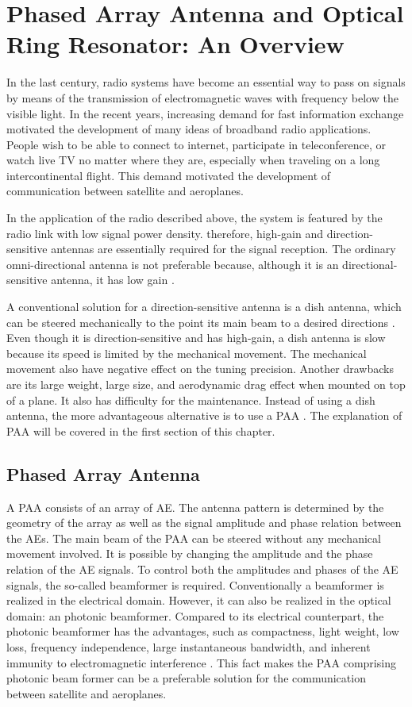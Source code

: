 %
\chapter{Phased Array Antenna and Optical Ring Resonator: An Overview}

In the last century, radio systems have become an essential way to pass on signals by means of the transmission of electromagnetic waves with frequency below the visible light. In the recent years, increasing demand for fast information exchange motivated the development of many ideas of broadband radio applications. People wish to be able to connect to internet, participate in teleconference, or watch live TV no matter where they are, especially when traveling on a long intercontinental flight. This demand motivated the development of communication between satellite and aeroplanes.

In the application of the radio described above, the system is featured by the radio link with low signal power density. therefore, high-gain and direction-sensitive antennas are essentially required for the signal reception. The ordinary omni-directional antenna is not preferable because, although it is an directional-sensitive antenna, it has low gain \citep{cheng1989field}.

A conventional solution for a direction-sensitive antenna is a dish antenna, which can be steered mechanically to the point its main beam to a desired directions \citep{wilson2013tools}. Even though it is direction-sensitive and has high-gain, a dish antenna is slow because its speed is limited by the mechanical movement. The mechanical movement also have negative effect on the tuning precision. Another drawbacks are its large weight, large size, and aerodynamic drag effect when mounted on top of a plane. It also has difficulty for the maintenance. Instead of using a dish antenna, the more advantageous alternative is to use a \ac{PAA} \cite{balanis2008modern,MeijerinkPhased}. The explanation of \ac{PAA} will be covered in the first section of this chapter.

\section{Phased Array Antenna}
A \ac{PAA} consists of an array of \ac{AE}. The antenna pattern is determined by the geometry of the array as well as the signal amplitude and phase relation between the \ac{AE}s. The main beam of the \ac{PAA} can be steered without any mechanical movement involved. It is possible by changing the amplitude and the phase relation of the \ac{AE} signals. To control both the amplitudes and phases of the AE signals, the so-called beamformer is required. Conventionally a beamformer is realized in
the electrical domain. However, it can also be realized in the optical domain: an photonic beamformer. Compared to its
electrical counterpart, the photonic beamformer has the advantages, such as compactness, light weight, low loss, frequency independence, large instantaneous bandwidth, and inherent immunity to electromagnetic interference \citep{zhuang2010ring}. This fact makes the PAA comprising photonic beam former can be a preferable solution for the communication between satellite and aeroplanes.

